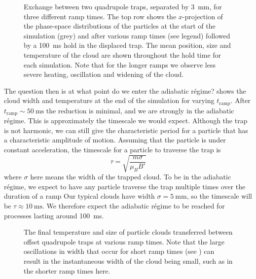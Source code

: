 \begin{figure}[p]
\centering
  \caption{
    Exchange between two quadrupole traps, separated by \SI{3}{\milli\meter},
    for three different ramp times. The top row shows the $x$-projection of the
    phase-space distributions of the particles at the start of the simulation
    (grey) and after various ramp times (see legend) followed by a
    \SI{100}{\milli\second} hold in the displaced trap. The mean position, size
    and temperature of the cloud are shown throughout the hold time for each
    simulation. Note that for the longer ramps we observe less severe heating,
    oscillation and widening of the cloud.
  }
  \label{sim:fig:adia3sim}
\end{figure}


The question then is at what point do we enter the adiabatic r\'egime?
 shows the cloud width and temperature at the end
of the simulation for varying $t_\text{ramp}$. After
$t_\text{ramp}\sim\SI{50}{\milli\second}$ the reduction is minimal, and we are
strongly in the adiabatic r\'egime. This is approximately the timescale we
would expect. Although the trap is not harmonic, we can still give the
characteristic period for a particle that has a characteristic amplitude of
motion. Assuming that the particle is under constant acceleration, the
timescale for a particle to traverse the trap is
%
\begin{equation}
  \tau = \sqrt{\frac{m \sigma}{\mu_B B'}}
\end{equation}
%
where $\sigma$ here means the width of the trapped cloud. To be in the
adiabatic r\'egime, we expect to have any particle traverse the trap multiple
times over the duration of a ramp Our typical \CaF{}
clouds
have width $\sigma = \SI{5}{\milli\meter}$, so the timescale will be $\tau
\approx \SI{10}{\milli\second}$. We therefore expect the adiabatic r\'egime to
be reached for processes lasting around \SI{100}{\milli\second}.

\begin{figure}[t!]
\centering
  \caption{
    The final temperature and size of particle clouds transferred between
    offset quadrupole traps at various ramp times. Note that the large
    oscillations in width that occur for short ramp times (see
    ) can result in the instantaneous width of
    the cloud being small, such as in the shorter ramp times here.
  }
  \label{sim:fig:adiavary}
\end{figure}

